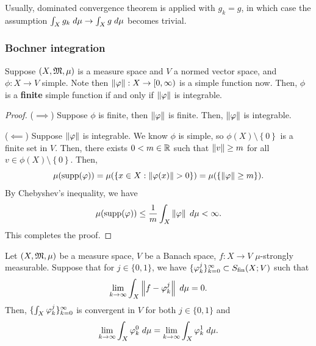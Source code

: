 \documentclass[a4paper]{article}
\begin{document}
\begin{remark}
Usually, dominated convergence theorem is applied with 
$g_k = g$, in which case the assumption 
$\int_X g_k \; d \mu \to \int_X g \; d \mu$ becomes trivial.
\end{remark}

\subsubsection{Bochner integration}
\begin{lemma}
Suppose $(X, \mathfrak{M}, \mu)$ is a measure space and $V$ a normed 
vector space, and $\phi: X \to V$ simple. 
Note then $\left\lVert \varphi\right\rVert : X \to [0, \infty)$ 
is a simple function now. 
Then, $\phi$ is a \textbf{finite} simple function
if and only if $\left\lVert \varphi\right\rVert$ is integrable. 
\end{lemma}

\begin{proof}
($\implies$) Suppose $\phi$ is finite, then 
$\left\lVert \varphi\right\rVert$ is finite. Then, $\left\lVert \varphi\right\rVert$ is integrable.

($\impliedby$) Suppose $\left\lVert \varphi\right\rVert$ is integrable. We know 
$\phi$ is simple, so $\phi(X) \setminus \left\{ 0 \right\}$
is a finite set in $V$. Then, there exists $0 < m \in \mathbb{R}$ such 
that $\left\lVert v\right\rVert \geq m$ for all $v \in \phi(X) \setminus \left\{ 
0 \right\}$. Then, 
\[
\mu(\operatorname{supp}(\varphi)) = \mu(\{x \in X : \left\lVert \varphi(x)\right\rVert > 0\})
= \mu(\{\left\lVert \varphi\right\rVert \geq m\}).
\]
By Chebyshev's inequality, we have 
\[
\mu(\operatorname{supp}(\varphi)) \leq \frac{1}{m} \int_X \left\lVert \varphi\right\rVert \; d \mu < \infty.
\]
This completes the proof.
\end{proof}

\begin{lemma}
Let $(X, \mathfrak{M}, \mu)$ be a measure space, $V$ be a Banach space,
$f: X \to V$ $\mu$-strongly measurable. Suppose that for 
$j \in \{0, 1\}$, we have $\{ \varphi_k^j \}_{k=0}^\infty \subset S_{\text{fin}}(X; V)$
such that 
\[
  \lim_{k \to \infty} \int_X \left\lVert f - \varphi_k^j\right\rVert \; d \mu = 0.
\]
Then, $\{ \int_X \varphi_k^j \}_{k=0}^\infty$ is convergent in $V$ 
for both $j \in \{0, 1\}$ and 
\[
\lim_{k \to \infty} \int_X \varphi_k^0 \; d \mu = 
\lim_{k \to \infty} \int_X \varphi_k^1 \; d \mu.
\]
\end{lemma}
\end{document}
